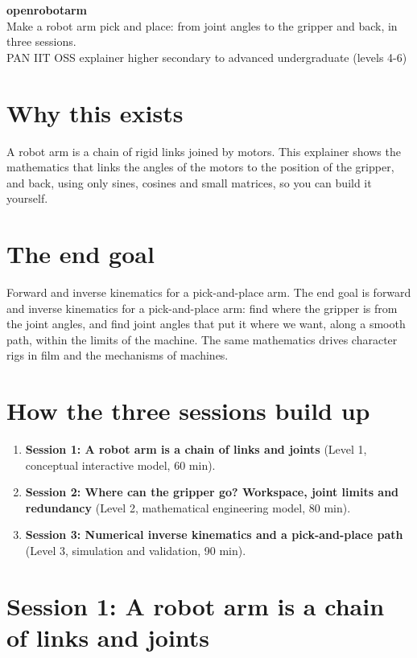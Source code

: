 \documentclass[11pt,a4paper]{article}
\begin{document}
\begin{center}{\LARGE\bfseries openrobotarm}\\[0.4em]{\large Make a robot arm pick and place: from joint angles to the gripper and back, in three sessions.}\\[0.2em]\small PAN IIT OSS explainer \textbullet{} higher secondary to advanced undergraduate (levels 4-6)\end{center}

\section*{Why this exists}
A robot arm is a chain of rigid links joined by motors. This explainer shows the mathematics that links the angles of the motors to the position of the gripper, and back, using only sines, cosines and small matrices, so you can build it yourself.

\section*{The end goal}
Forward and inverse kinematics for a pick-and-place arm. The end goal is forward and inverse kinematics for a pick-and-place arm: find where the gripper is from the joint angles, and find joint angles that put it where we want, along a smooth path, within the limits of the machine. The same mathematics drives character rigs in film and the mechanisms of machines.

\section*{How the three sessions build up}
\begin{enumerate}[nosep]
\item \textbf{Session 1: A robot arm is a chain of links and joints} (Level 1, conceptual interactive model, 60 min).
\item \textbf{Session 2: Where can the gripper go? Workspace, joint limits and redundancy} (Level 2, mathematical engineering model, 80 min).
\item \textbf{Session 3: Numerical inverse kinematics and a pick-and-place path} (Level 3, simulation and validation, 90 min).
\end{enumerate}

\section{Session 1: A robot arm is a chain of links and joints}
\end{document}
